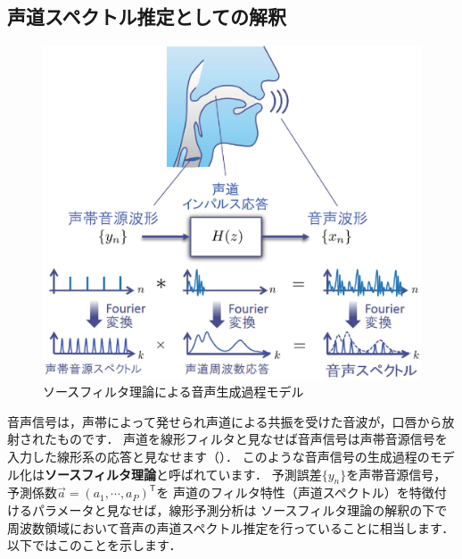 \subsection{声道スペクトル推定としての解釈}
\label{subsec:FD_LPC}

\begin{figure}[t!]
\centering
\includegraphics[width=.98\linewidth,keepaspectratio=true]{sections/speech/sourcefiltermodel3.eps}
\vspace{0ex}
 \caption{ソースフィルタ理論による音声生成過程モデル}
\label{fig:sourcefiltermodel}
\vspace{0ex}
\end{figure}

音声信号は，声帯によって発せられ声道による共振を受けた音波が，口唇から放射されたものです．
声道を線形フィルタと見なせば音声信号は声帯音源信号を入力した線形系の応答と見なせます（）．
このような音声信号の生成過程のモデル化は{\bf ソースフィルタ理論}と呼ばれています\cite{Chiba1941,Fant1960}．
予測誤差$\{y_n\}$を声帯音源信号，
予測係数$\Vec{a} = (a_1,\cdots,a_P)^{\mathsf T}$を
声道のフィルタ特性（声道スペクトル）を特徴付けるパラメータと見なせば，線形予測分析は
ソースフィルタ理論の解釈の下で
周波数領域において音声の声道スペクトル推定を行っていることに相当します．
以下ではこのことを示します．


